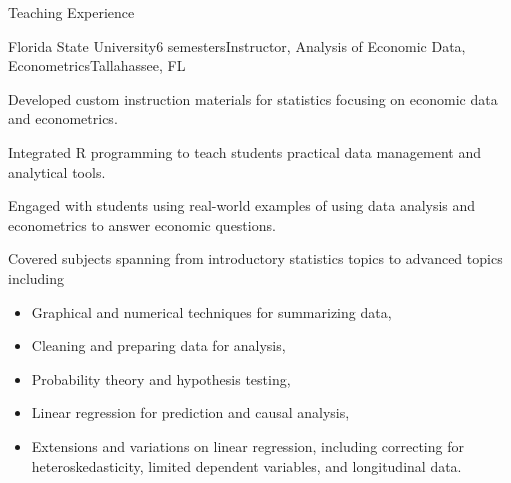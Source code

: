 \documentclass{resume} %
\begin{document}
\begin{rSection}{Teaching Experience}
    \begin{rSubsection}{Florida State University}{6 semesters}{Instructor, Analysis of Economic Data, Econometrics}{Tallahassee, FL}
        \item Developed custom instruction materials for statistics focusing on economic data and econometrics.
        \item Integrated R programming to teach students practical data management and analytical tools.
        \item Engaged with students using real-world examples of using data analysis and econometrics to answer economic questions.
        \item Covered subjects spanning from introductory statistics topics to advanced topics including
        \newpage
        \begin{itemize}
            \item Graphical and numerical techniques for summarizing data,
            \item Cleaning and preparing data for analysis,
            \item Probability theory and hypothesis testing,
            \item Linear regression for prediction and causal analysis,
            \item Extensions and variations on linear regression, including correcting for heteroskedasticity, limited dependent variables, and longitudinal data.
        \end{itemize}
    \end{rSubsection}
\end{rSection}
\end{document}
